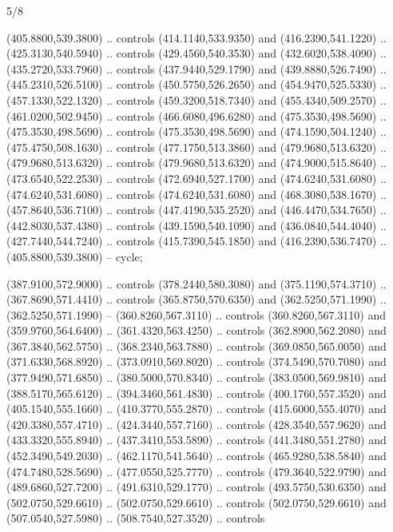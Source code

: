 \begin{flagdescription}{5/8}
\begin{scope}[shift={(m)}]
\begin{scope}[scale=\flagwidth/220,y=0.1mm, x=0.1mm, yscale=-1,shift={(-596,-360)}]
\begin{scope}[draw=black,line join=round,line cap=round,line width=0.381\lw]
\begin{scope}[line width=0.534\lw,fill=green]
 (405.8800,539.3800) .. controls (414.1140,533.9350) and
  (416.2390,541.1220) .. (425.3130,540.5940) .. controls (429.4560,540.3530) and
  (432.6020,538.4090) .. (435.2720,533.7960) .. controls (437.9440,529.1790) and
  (439.8880,526.7490) .. (445.2310,526.5100) .. controls (450.5750,526.2650) and
  (454.9470,525.5330) .. (457.1330,522.1320) .. controls (459.3200,518.7340) and
  (455.4340,509.2570) .. (461.0200,502.9450) .. controls (466.6080,496.6280) and
  (475.3530,498.5690) .. (475.3530,498.5690) .. controls (475.3530,498.5690) and
  (474.1590,504.1240) .. (475.4750,508.1630) .. controls (477.1750,513.3860) and
  (479.9680,513.6320) .. (479.9680,513.6320) .. controls (479.9680,513.6320) and
  (474.9000,515.8640) .. (473.6540,522.2530) .. controls (472.6940,527.1700) and
  (474.6240,531.6080) .. (474.6240,531.6080) .. controls (474.6240,531.6080) and
  (468.3080,538.1670) .. (457.8640,536.7100) .. controls (447.4190,535.2520) and
  (446.4470,534.7650) .. (442.8030,537.4380) .. controls (439.1590,540.1090) and
  (436.0840,544.4040) .. (427.7440,544.7240) .. controls (415.7390,545.1850) and
  (416.2390,536.7470) .. (405.8800,539.3800) -- cycle;
\end{scope}
\begin{scope}[fill=white,line width=1.143\lw]
 (387.9100,572.9000) .. controls (378.2440,580.3080) and
  (375.1190,574.3710) .. (367.8690,571.4410) .. controls (365.8750,570.6350) and
  (362.5250,571.1990) .. (362.5250,571.1990) -- (360.8260,567.3110) .. controls
  (360.8260,567.3110) and (359.9760,564.6400) .. (361.4320,563.4250) .. controls
  (362.8900,562.2080) and (367.3840,562.5750) .. (368.2340,563.7880) .. controls
  (369.0850,565.0050) and (371.6330,568.8920) .. (373.0910,569.8020) .. controls
  (374.5490,570.7080) and (377.9490,571.6850) .. (380.5000,570.8340) .. controls
  (383.0500,569.9810) and (388.5170,565.6120) .. (394.3460,561.4830) .. controls
  (400.1760,557.3520) and (405.1540,555.1660) .. (410.3770,555.2870) .. controls
  (415.6000,555.4070) and (420.3380,557.4710) .. (424.3440,557.7160) .. controls
  (428.3540,557.9620) and (433.3320,555.8940) .. (437.3410,553.5890) .. controls
  (441.3480,551.2780) and (452.3490,549.2030) .. (462.1170,541.5640) .. controls
  (465.9280,538.5840) and (474.7480,528.5690) .. (477.0550,525.7770) .. controls
  (479.3640,522.9790) and (489.6860,527.7200) .. (491.6310,529.1770) .. controls
  (493.5750,530.6350) and (502.0750,529.6610) .. (502.0750,529.6610) .. controls
  (502.0750,529.6610) and (507.0540,527.5980) .. (508.7540,527.3520) .. controls

\end{scope}
\end{scope}
\end{scope}
\end{scope}
\end{flagdescription}
